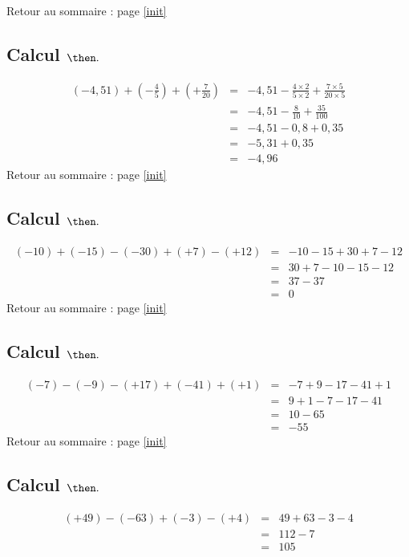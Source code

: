 \documentclass[14pt]{article}
\theoremstyle{remark}
\newcounter{n}
\renewcommand{\it}{Retour au sommaire : page \ref{init}
	\subsection{Calcul $ \mathbf{ \then}.$}\label{\then} \stepcounter{n} }
\theoremstyle{plain}
\begin{document}
\it \begin{eqnarray*}
(-4,51)+\left(-\frac45\right)+\left(+\frac7{20}\right)
&=& -4,51 - \frac{4\times2}{5\times2} + \frac{7\times5}{20\times5}\\
&=& -4,51 - \frac{8}{10} + \frac{35}{100}\\
&=& -4,51 - 0,8 + 0,35 \\
&=& -5,31 + 0,35 \\
&=& -4,96
\end{eqnarray*} 
\it \begin{eqnarray*}(-10)+(-15)-(-30)+(+7)-(+12)&=&
-10 - 15 +30 + 7 - 12 \\
&=& 30 + 7 -10 -15 -12\\
&=& 37 - 37 \\
&=&0\end{eqnarray*}
\it \begin{eqnarray*}
(-7)-(-9)-(+17)+(-41)+(+1)&=& -7 + 9 - 17 -41 + 1\\
&=& 9+1 -7-17-41\\
&=& 10 - 65 \\
&=&-55
\end{eqnarray*}
\it \begin{eqnarray*} (+49)-(-63)+(-3)-(+4)&=& 49+63-3-4\\
&=& 112 - 7 \\
&=& 105\end{eqnarray*}
\end{document}
